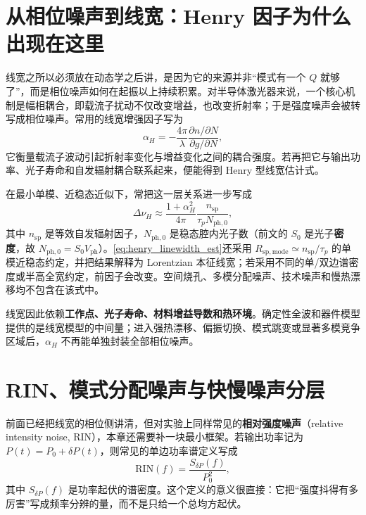 \section{从相位噪声到线宽：Henry 因子为什么出现在这里}
线宽之所以必须放在动态学之后讲，是因为它的来源并非“模式有一个 $Q$ 就够了”，而是相位噪声如何在起振以上持续积累。对半导体激光器来说，一个核心机制是幅相耦合，即载流子扰动不仅改变增益，也改变折射率；于是强度噪声会被转写成相位噪声。常用的线宽增强因子写为
\begin{equation}
\alpha_H
=
-\frac{4\pi}{\lambda}
\frac{\partial n / \partial N}{\partial g / \partial N},
\label{eq:alpha_h}
\end{equation}
它衡量载流子波动引起折射率变化与增益变化之间的耦合强度。若再把它与输出功率、光子寿命和自发辐射耦合联系起来，便能得到 Henry 型线宽估计式。

在最小单模、近稳态近似下，常把这一层关系进一步写成
\begin{equation}
\Delta\nu_H
\approx
\frac{1+\alpha_H^2}{4\pi}
\frac{n_{\mathrm{sp}}}{\tau_p N_{\mathrm{ph},0}},
\label{eq:henry_linewidth_est}
\end{equation}
其中 $n_{\mathrm{sp}}$ 是等效自发辐射因子，$N_{\mathrm{ph},0}$ 是稳态腔内光子数（前文的 $S_0$ 是光子\textbf{密度}，故 $N_{\mathrm{ph},0}=S_0V_{\mathrm{ph}}$）。\cref{eq:henry_linewidth_est}还采用 $R_{\mathrm{sp,mode}}\simeq n_{\mathrm{sp}}/\tau_p$ 的单模近稳态约定，并把结果解释为 Lorentzian 本征线宽；若采用不同的单/双边谱密度或半高全宽约定，前因子会改变。空间烧孔、多模分配噪声、技术噪声和慢热漂移均不包含在该式中。

线宽因此依赖\textbf{工作点、光子寿命、材料增益导数和热环境}。确定性全波和器件模型提供的是线宽模型的中间量；进入强热漂移、偏振切换、模式跳变或显著多模竞争区域后，$\alpha_H$ 不再能单独封装全部相位噪声。

\section{RIN、模式分配噪声与快慢噪声分层}
前面已经把线宽的相位侧讲清，但对实验上同样常见的\textbf{相对强度噪声}（relative intensity noise, RIN），本章还需要补一块最小框架。若输出功率记为 $P(t)=P_0+\delta P(t)$，则常见的单边功率谱定义写成
\begin{equation}
\mathrm{RIN}(f)
=
\frac{S_{\delta P}(f)}{P_0^2},
\label{eq:rin_def}
\end{equation}
其中 $S_{\delta P}(f)$ 是功率起伏的谱密度。这个定义的意义很直接：它把“强度抖得有多厉害”写成频率分辨的量，而不是只给一个总均方起伏。

